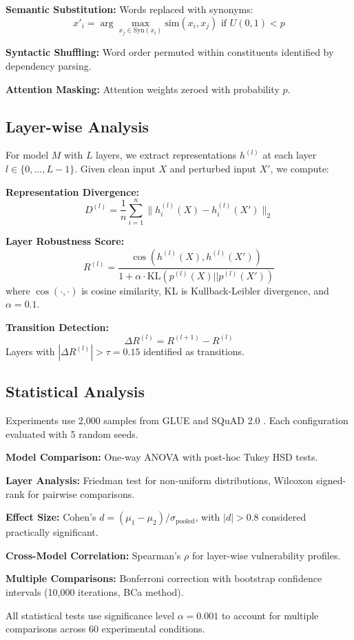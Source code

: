 \textbf{Semantic Substitution:} Words replaced with synonyms:
\begin{equation}
x'_i = \arg\max_{x_j \in \text{Syn}(x_i)} \text{sim}(x_i, x_j) \text{ if } U(0,1) < p
\end{equation}

\textbf{Syntactic Shuffling:} Word order permuted within constituents identified by dependency parsing.

\textbf{Attention Masking:} Attention weights zeroed with probability $p$.

\subsection{Layer-wise Analysis}

For model $M$ with $L$ layers, we extract representations $h^{(l)}$ at each layer $l \in \{0, ..., L-1\}$. Given clean input $X$ and perturbed input $X'$, we compute:

\textbf{Representation Divergence:}
\begin{equation}
D^{(l)} = \frac{1}{n} \sum_{i=1}^n \| h_i^{(l)}(X) - h_i^{(l)}(X') \|_2
\end{equation}

\textbf{Layer Robustness Score:}
\begin{equation}
R^{(l)} = \frac{\cos(h^{(l)}(X), h^{(l)}(X'))}{1 + \alpha \cdot \text{KL}(p^{(l)}(X)||p^{(l)}(X'))}
\end{equation}
where $\cos(\cdot,\cdot)$ is cosine similarity, KL is Kullback-Leibler divergence, and $\alpha=0.1$.

\textbf{Transition Detection:}
\begin{equation}
\Delta R^{(l)} = R^{(l+1)} - R^{(l)}
\end{equation}
Layers with $|\Delta R^{(l)}| > \tau=0.15$ identified as transitions.

\subsection{Statistical Analysis}

Experiments use 2,000 samples from GLUE \cite{wang2018glue} and SQuAD 2.0 \cite{rajpurkar2018squad}. Each configuration evaluated with 5 random seeds.

\textbf{Model Comparison:} One-way ANOVA with post-hoc Tukey HSD tests.

\textbf{Layer Analysis:} Friedman test for non-uniform distributions, Wilcoxon signed-rank for pairwise comparisons.

\textbf{Effect Size:} Cohen's $d = (\mu_1 - \mu_2)/\sigma_{\text{pooled}}$, with $|d| > 0.8$ considered practically significant.

\textbf{Cross-Model Correlation:} Spearman's $\rho$ for layer-wise vulnerability profiles.

\textbf{Multiple Comparisons:} Bonferroni correction with bootstrap confidence intervals (10,000 iterations, BCa method).

All statistical tests use significance level $\alpha = 0.001$ to account for multiple comparisons across 60 experimental conditions.